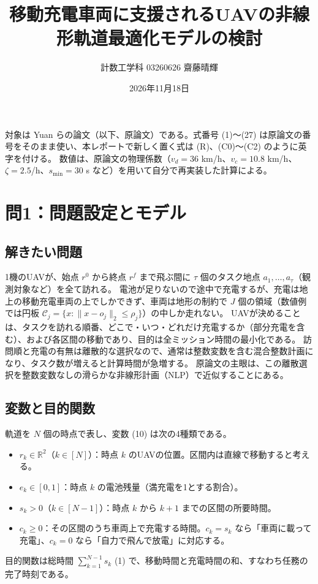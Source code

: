 \documentclass[uplatex,dvipdfmx,a4paper,11pt,jafont=haranoaji]{bxjsarticle}
\newcommand{\answerpart}[1]{\par\Needspace{6\baselineskip}\subsection*{#1}}
\newcommand{\norm}[1]{\lVert #1\rVert_2}
\begin{document}
\title{移動充電車両に支援されるUAVの非線形軌道最適化モデルの検討}
\author{計数工学科 03260626 齋藤晴輝}
\date{2026年11月18日}
\maketitle
\thispagestyle{fancy}

対象は Yuan ら\cite{yuan}の論文（以下、原論文）である。式番号 (1)〜(27) は原論文の番号をそのまま使い、本レポートで新しく置く式は (R)、(C0)〜(C2) のように英字を付ける。
数値は、原論文の物理係数（$v_d=36$ km/h、$v_c=10.8$ km/h、$\zeta=2.5$/h、$s_{\min}=30$ s など）を用いて自分で再実装した計算による。

\section{問1：問題設定とモデル}

\answerpart{解きたい問題}
1機のUAVが、始点 $r^0$ から終点 $r^f$ まで飛ぶ間に $\tau$ 個のタスク地点 $a_1,\dots,a_\tau$（観測対象など）を全て訪れる。
電池が足りないので途中で充電するが、充電は地上の移動充電車両の上でしかできず、車両は地形の制約で $J$ 個の領域（数値例では円板 $\mathcal C_j=\{x:\norm{x-o_j}\le\rho_j\}$）の中しか走れない。
UAVが決めることは、タスクを訪れる順番、どこで・いつ・どれだけ充電するか（部分充電を含む）、および各区間の移動であり、目的は全ミッション時間の最小化である。
訪問順と充電の有無は離散的な選択なので、通常は整数変数を含む混合整数計画になり、タスク数が増えると計算時間が急増する。
原論文の主眼は、この離散選択を整数変数なしの滑らかな非線形計画（NLP）で近似することにある。

\answerpart{変数と目的関数}
軌道を $N$ 個の時点で表し、変数 (10) は次の4種類である。
\begin{itemize}
  \item $r_k\in\mathbb R^2$（$k\in[N]$）：時点 $k$ のUAVの位置。区間内は直線で移動すると考える。
  \item $e_k\in[0,1]$：時点 $k$ の電池残量（満充電を1とする割合）。
  \item $s_k>0$（$k\in[N-1]$）：時点 $k$ から $k+1$ までの区間の所要時間。
  \item $c_k\ge0$：その区間のうち車両上で充電する時間。$c_k=s_k$ なら「車両に載って充電」、$c_k=0$ なら「自力で飛んで放電」に対応する。
\end{itemize}
目的関数は総時間 $\sum_{k=1}^{N-1}s_k$ (1) で、移動時間と充電時間の和、すなわち任務の完了時刻である。
\end{document}
